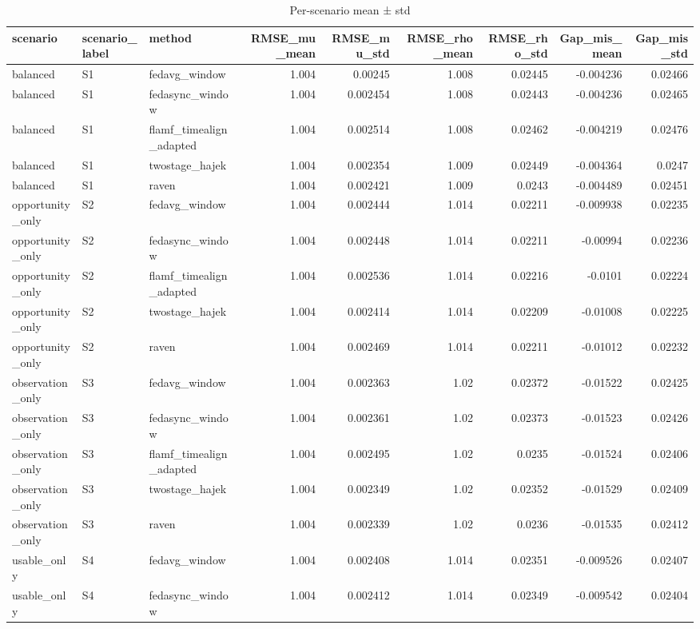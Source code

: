 \begin{table}
\caption{Per-scenario mean ± std}
\label{tab:table_e2a}
\begin{tabular}{lllrrrrrr}
\toprule
scenario & scenario_label & method & RMSE_mu_mean & RMSE_mu_std & RMSE_rho_mean & RMSE_rho_std & Gap_mis_mean & Gap_mis_std \\
\midrule
balanced & S1 & fedavg_window & 1.004 & 0.00245 & 1.008 & 0.02445 & -0.004236 & 0.02466 \\
balanced & S1 & fedasync_window & 1.004 & 0.002454 & 1.008 & 0.02443 & -0.004236 & 0.02465 \\
balanced & S1 & flamf_timealign_adapted & 1.004 & 0.002514 & 1.008 & 0.02462 & -0.004219 & 0.02476 \\
balanced & S1 & twostage_hajek & 1.004 & 0.002354 & 1.009 & 0.02449 & -0.004364 & 0.0247 \\
balanced & S1 & raven & 1.004 & 0.002421 & 1.009 & 0.0243 & -0.004489 & 0.02451 \\
opportunity_only & S2 & fedavg_window & 1.004 & 0.002444 & 1.014 & 0.02211 & -0.009938 & 0.02235 \\
opportunity_only & S2 & fedasync_window & 1.004 & 0.002448 & 1.014 & 0.02211 & -0.00994 & 0.02236 \\
opportunity_only & S2 & flamf_timealign_adapted & 1.004 & 0.002536 & 1.014 & 0.02216 & -0.0101 & 0.02224 \\
opportunity_only & S2 & twostage_hajek & 1.004 & 0.002414 & 1.014 & 0.02209 & -0.01008 & 0.02225 \\
opportunity_only & S2 & raven & 1.004 & 0.002469 & 1.014 & 0.02211 & -0.01012 & 0.02232 \\
observation_only & S3 & fedavg_window & 1.004 & 0.002363 & 1.02 & 0.02372 & -0.01522 & 0.02425 \\
observation_only & S3 & fedasync_window & 1.004 & 0.002361 & 1.02 & 0.02373 & -0.01523 & 0.02426 \\
observation_only & S3 & flamf_timealign_adapted & 1.004 & 0.002495 & 1.02 & 0.0235 & -0.01524 & 0.02406 \\
observation_only & S3 & twostage_hajek & 1.004 & 0.002349 & 1.02 & 0.02352 & -0.01529 & 0.02409 \\
observation_only & S3 & raven & 1.004 & 0.002339 & 1.02 & 0.0236 & -0.01535 & 0.02412 \\
usable_only & S4 & fedavg_window & 1.004 & 0.002408 & 1.014 & 0.02351 & -0.009526 & 0.02407 \\
usable_only & S4 & fedasync_window & 1.004 & 0.002412 & 1.014 & 0.02349 & -0.009542 & 0.02404 \\

\end{tabular}
\end{table}
